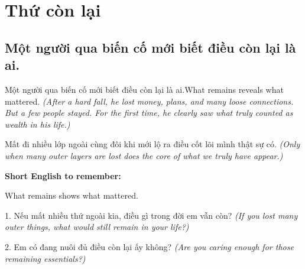 \chapter{Thứ còn lại}

\section{Một người qua biến cố mới biết điều còn lại là ai.}
\begin{truyen}{Một người qua biến cố mới biết điều còn lại là ai.}{What remains reveals what mattered.}
\textit{(After a hard fall, he lost money, plans, and many loose connections. But a few people stayed. For the first time, he clearly saw what truly counted as wealth in his life.)}
\end{truyen}
\begin{baihoc}
Mất đi nhiều lớp ngoài cùng đôi khi mới lộ ra điều cốt lõi mình thật sự có.
\textit{(Only when many outer layers are lost does the core of what we truly have appear.)}
\end{baihoc}
\begin{ghinhoanh}\textbf{Short English to remember:}

What remains shows what mattered.
\end{ghinhoanh}
\begin{tuhocnhanh}
1. Nếu mất nhiều thứ ngoài kia, điều gì trong đời em vẫn còn? \textit{(If you lost many outer things, what would still remain in your life?)}

2. Em có đang nuôi đủ điều còn lại ấy không? \textit{(Are you caring enough for those remaining essentials?)}
\end{tuhocnhanh}
\ngancach

